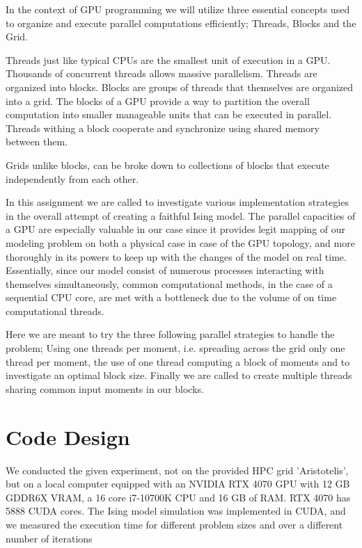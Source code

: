 \documentclass[twocolumn]{article}
\begin{document}
In the context of GPU programming we will utilize three essential concepts used to organize and execute parallel computations efficiently; Threads, Blocks and the Grid.

Threads just like typical CPUs are the smallest unit of execution in a GPU. Thousands of concurrent threads allows massive parallelism. Threads are organized into blocks. Blocks are groups of threads that themselves are organized into a grid. The blocks of a GPU provide a way to partition the overall computation into smaller manageable units that can be executed in parallel. Threads withing a block cooperate and synchronize using shared memory between them.

Grids unlike blocks, can be broke down to collections of blocks that execute independently from each other.

In this assignment we are called to investigate various implementation strategies in the overall attempt of creating a faithful Ising model. The parallel capacities of a GPU are especially valuable in our case since it provides legit mapping of our modeling problem on both a physical case in case of the GPU topology, and more thoroughly in its powers to keep up with the changes of the model on real time. Essentially, since our model consist of numerous processes interacting with themselves simultaneously, common computational methods, in the case of a sequential CPU core, are met with a bottleneck due to the volume of on time computational threads.

Here we are meant to try the three following parallel strategies to handle the problem; Using one threads per moment, i.e. spreading across the grid only one thread per moment, the use of one thread computing a block of moments and to investigate an optimal block size. Finally we are called to create multiple threads sharing common input moments in our blocks.

\section{Code Design}

We conducted the given experiment, not on the provided HPC grid 'Aristotelis', but on a local computer equipped with an NVIDIA RTX 4070 GPU with 12 GB GDDR6X VRAM, a 16 core i7-10700K CPU and 16 GB of RAM. RTX 4070 has 5888 CUDA cores. The Ising model simulation was implemented in CUDA, and we measured the execution time for different problem sizes and over a different number of iterations
\end{document}
